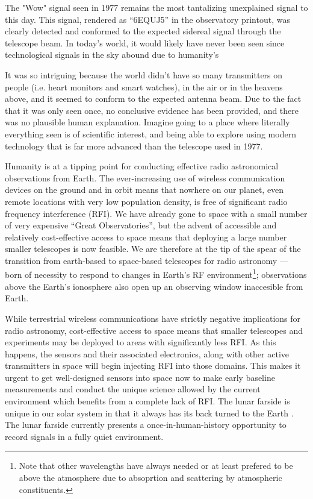 The "Wow" signal seen in 1977 \citep{wow} remains the most tantalizing unexplained signal to this day.  This signal, rendered as ``6EQUJ5'' in the observatory printout, was clearly detected and conformed to the expected sidereal signal through the telescope beam.  In today's world, it would likely have never been seen since technological signals in the sky abound due to humanity's 

It was so intriguing because the world didn't have so many transmitters on people (i.e. heart monitors and smart watches), in the air or in the heavens above, and it seemed to conform to the expected antenna beam. Due to the fact that it was only seen once, no conclusive evidence has been provided, and there was no plausible human explanation. Imagine going to a place where literally everything seen is of scientific interest, and being able to explore using modern technology that is far more advanced than the telescope used in 1977.   

Humanity is at a tipping point for conducting effective radio astronomical observations from Earth. The ever-increasing use of wireless communication devices on the ground and in orbit means that nowhere on our planet, even remote locations with very low population density, is free of significant radio frequency interference (RFI). We have already gone to space with a small number of very expensive ``Great Observatories'', but the advent of accessible and relatively cost-effective access to space means that deploying a large number smaller telescopes is now feasible. We are therefore at the tip of the spear of the transition from earth-based to space-based telescopes for radio astronomy --- born of necessity to respond to changes in Earth’s RF environment\footnote{Note that other wavelengths have always needed or at least prefered to be above the atmosphere due to absoprtion and scattering by atmospheric constituents.}; observations above the Earth's ionosphere also open up an observing window inaccesible from Earth.

While terrestrial wireless communications have strictly negative implications for radio astronomy, cost-effective access to space means that smaller telescopes and experiments may be deployed to areas with significantly less RFI. As this happens, the sensors and their associated electronics, along with other active transmitters in space will begin injecting RFI into those domains. This makes it urgent to get well-designed sensors into space now to make early baseline measurements and conduct the unique science allowed by the current environment which benefits from a complete lack of RFI. The lunar farside is unique in our solar system in that it always has its back turned to the Earth \citep{heidmann2002,MACCONE2019233,michaud2020lunar}. The lunar farside currently presents a once-in-human-history opportunity to record signals in a fully quiet environment. 

